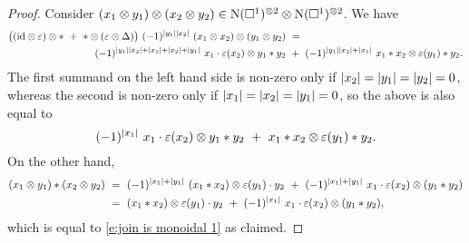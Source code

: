 \begin{proof}
	Consider $(x_1 \otimes y_1) \otimes (x_2 \otimes y_2) \in \operatorname{N}(\square^1)^{\otimes 2} \otimes \operatorname{N}(\square^1)^{\otimes 2}$.
	We have
	\[
	\begin{split}
	\big((\id \otimes \varepsilon) \otimes \ast \ + \ \ast \otimes (\varepsilon \otimes \Delta)\big) \ (-1)^{\bars{y_1} \bars{x_2}} \ (x_1 \otimes x_2) \otimes (y_1 \otimes y_2) \ & = \\
	(-1)^{\bars{y_1} \bars{x_2} + \bars{x_1} + \bars{x_2} + \bars{y_1}} \ x_1 \cdot \varepsilon(x_2) \otimes y_1 \ast y_2 \ & + \ 
	(-1)^{\bars{y_1} \bars{x_2} + \bars{x_1}} \ x_1 \ast x_2 \otimes \varepsilon(y_1) \ast y_2.
	\end{split}
	\]
	The first summand on the left hand side is non-zero only if $\vert{x_2}\vert = \vert{y_1}\vert = \vert{y_2}\vert = 0$, whereas the second is non-zero only if $\vert{x_1}\vert = \vert{x_2}\vert = \vert{y_1}\vert = 0$, so the above is also equal to
	\begin{equation} \label{e:join is monoidal 1}
	(-1)^{\bars{x_1}} \ x_1 \cdot \varepsilon(x_2) \otimes y_1 \ast y_2 \ + \ 
	x_1 \ast x_2 \otimes \varepsilon(y_1) \ast y_2.
	\end{equation}
	On the other hand,
	\begin{align*}
	(x_1 \otimes y_1) \ast (x_2 \otimes y_2) \ & =\ 
	(-1)^{\bars{x_1} + \bars{y_1}} \ (x_1 \ast x_2) \otimes \varepsilon(y_1) \cdot y_2 \ +\
	(-1)^{\bars{x_1} + \bars{y_1}} \ x_1 \cdot \varepsilon(x_2) \otimes (y_1 \ast y_2) \\ \ & =\ 
	(x_1 \ast x_2) \otimes \varepsilon(y_1) \cdot y_2 \ +\
	(-1)^{\bars{x_1}} \ x_1 \cdot \varepsilon(x_2) \otimes (y_1 \ast y_2),
	\end{align*}
	which is equal to \eqref{e:join is monoidal 1} as claimed.
\end{proof}

